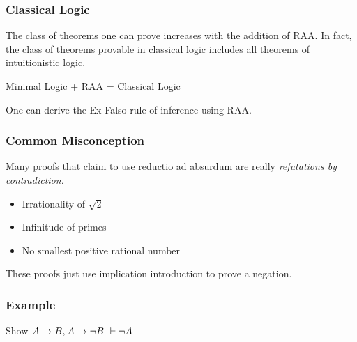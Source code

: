 \documentclass{beamer}
\begin{document}
\begin{frame}
  \frametitle{Classical Logic}

	The class of theorems one can prove increases with the addition of RAA. In fact, the class of theorems provable in classical logic includes all theorems of intuitionistic logic. 

	\begin{center}
  		Minimal Logic + RAA = Classical Logic 	
	\end{center}

	One can derive the Ex Falso rule of inference using RAA. 

	\vspace{4cm}

\end{frame}

\begin{frame}
	\frametitle{Common Misconception}

	Many proofs that claim to use reductio ad absurdum are really \emph{refutations by contradiction.}

	\begin{itemize}
		\item Irrationality of $\sqrt{2}$
		\item Infinitude of primes
		\item No smallest positive rational number
	\end{itemize}

	\vspace{30mm}

	These proofs just use implication introduction to prove a negation. 

\end{frame}

\begin{frame}
	\frametitle{Example}
	Show $A \rightarrow B, \hspace{0.20mm} A \rightarrow \lnot B \ \vdash \lnot A$
	\vspace{7cm}
	
	
	
\end{frame}
\end{document}
